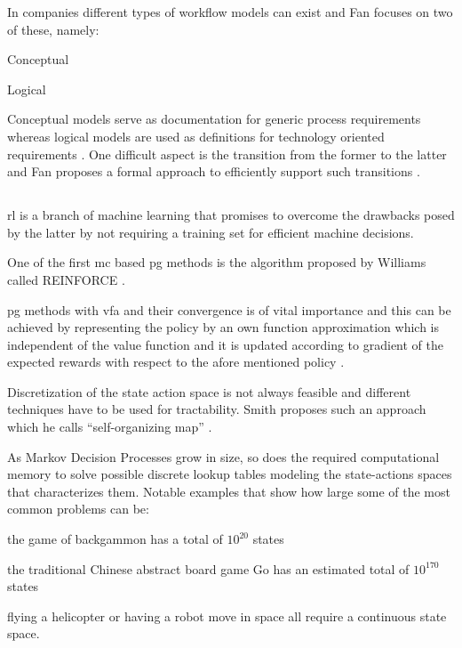 \documentclass{seal_thesis}
\begin{document}
In companies different types of workflow models can exist and Fan focuses on two of these, namely:
\begin{enumerate*}
	\item Conceptual
	\item Logical
\end{enumerate*}

Conceptual models serve as documentation for generic process requirements whereas logical models are used as definitions for technology oriented requirements \cite{Fan2012}. One difficult aspect is the transition from the former to the latter and Fan proposes a formal approach to efficiently support such transitions \cite{Fan2012}.

\subsection{}

\gls{rl} is a branch of machine learning that promises to overcome the drawbacks posed by the latter by not requiring a training set for efficient machine decisions.

One of the first \gls{mc} based \gls{pg} methods is the algorithm proposed by Williams called REINFORCE \cite{Williams1992}.

\gls{pg} methods with \gls{vfa} and their convergence is of vital importance and this can be achieved by representing the policy by an own function approximation which is independent of the value function and it is updated according to gradient of the expected rewards with respect to the afore mentioned policy \cite{Sutton1999}.

Discretization of the state action space is not always feasible and different techniques have to be used for tractability. Smith proposes such an approach which he calls ``self-organizing map'' \cite{Smith2002}.

As Markov Decision Processes grow in size, so does the required computational memory to solve possible discrete lookup tables modeling the state-actions spaces that characterizes them. Notable examples that show how large some of the most common problems can be:
\begin{enumerate*}
	\item the game of backgammon has a total of $10^{20}$ states
	\item the traditional Chinese abstract board game Go has an estimated total of $10^{170}$ states
	\item flying a helicopter or having a robot move in space all require a continuous state space.
\end{enumerate*}
\end{document}
